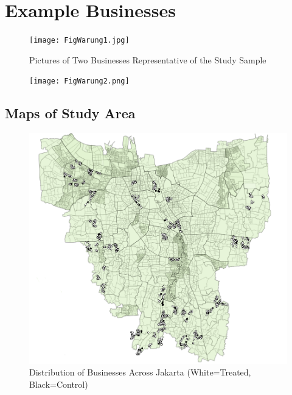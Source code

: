 \documentclass[11.5pt]{article}
\begin{document}
\clearpage{}
\begin{appendices}


\appendix


\pagebreak

\section{Example Businesses}\label{sec:expbusinesses}

\begin{figure}[h!]
\centering
\caption{Pictures of Two Businesses Representative of the Study Sample}
\label{warung1}
    \texttt{[image: FigWarung1.jpg]}
\end{figure}

\begin{figure}[h!]
\centering
\label{warung2}
    \texttt{[image: FigWarung2.png]}
\end{figure}

\pagebreak
\begin{landscape}
\section{Maps of Study Area} \label{sec:maps}

\begin{figure}[h!]
    \centering
    \caption{Distribution of Businesses Across Jakarta (White=Treated, Black=Control)}
    \includegraphics[width=120mm]{FigmapTC.png}
\end{figure}



\end{landscape}
\end{appendices}
\end{document}
